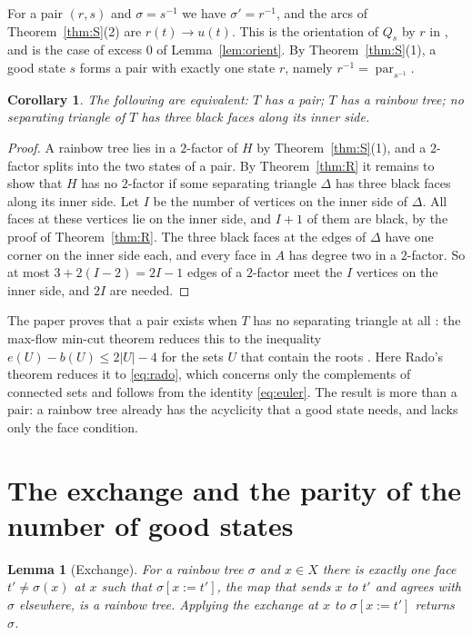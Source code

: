 \documentclass[10pt]{amsart}
\numberwithin{equation}{section}
\newtheorem{lemma}[equation]{Lemma}
\newtheorem{corollary}[equation]{Corollary}
\theoremstyle{definition}
\theoremstyle{remark}
\newcommand{\parent}{\operatorname{par}}
\begin{document}
For a pair $(r,s)$ and $\sigma=s^{-1}$ we have $\sigma'=r^{-1}$, and the arcs of Theorem~\ref{thm:S}(2) are $r(t)\to u(t)$.
This is the orientation of $Q_s$ by $r$ in \cite[Section~4]{Paper}, and \cite[Lemma~5.5(1)]{Paper} is the case of excess $0$ of Lemma~\ref{lem:orient}.
By Theorem~\ref{thm:S}(1), a good state $s$ forms a pair with exactly one state $r$, namely $r^{-1}=\parent_{s^{-1}}$.

\begin{corollary}\label{cor:pair}
The following are equivalent: $T$ has a pair; $T$ has a rainbow tree; no separating triangle of $T$ has three black faces along its inner side.
\end{corollary}

\begin{proof}
A rainbow tree lies in a $2$-factor of $H$ by Theorem~\ref{thm:S}(1), and a $2$-factor splits into the two states of a pair.
By Theorem~\ref{thm:R} it remains to show that $H$ has no $2$-factor if some separating triangle $\Delta$ has three black faces along its inner side.
Let $I$ be the number of vertices on the inner side of $\Delta$.
All faces at these vertices lie on the inner side, and $I+1$ of them are black, by the proof of Theorem~\ref{thm:R}.
The three black faces at the edges of $\Delta$ have one corner on the inner side each, and every face in $A$ has degree two in a $2$-factor.
So at most $3+2(I-2)=2I-1$ edges of a $2$-factor meet the $I$ vertices on the inner side, and $2I$ are needed.
\end{proof}

The paper proves that a pair exists when $T$ has no separating triangle at all \cite[Proposition~4.6]{Paper}: the max-flow min-cut theorem reduces this to the inequality $e(U)-b(U)\le2|U|-4$ for the sets $U$ that contain the roots \cite[Lemma~4.4]{Paper}.
Here Rado's theorem reduces it to \eqref{eq:rado}, which concerns only the complements of connected sets and follows from the identity \eqref{eq:euler}.
The result is more than a pair: a rainbow tree already has the acyclicity that a good state needs, and lacks only the face condition.

\section{The exchange and the parity of the number of good states}\label{sec:even}

\begin{lemma}[Exchange]\label{lem:exchange}
For a rainbow tree $\sigma$ and $x\in X$ there is exactly one face $t'\ne\sigma(x)$ at $x$ such that $\sigma[x:=t']$, the map that sends $x$ to $t'$ and agrees with $\sigma$ elsewhere, is a rainbow tree.
Applying the exchange at $x$ to $\sigma[x:=t']$ returns $\sigma$.
\end{lemma}
\end{document}
